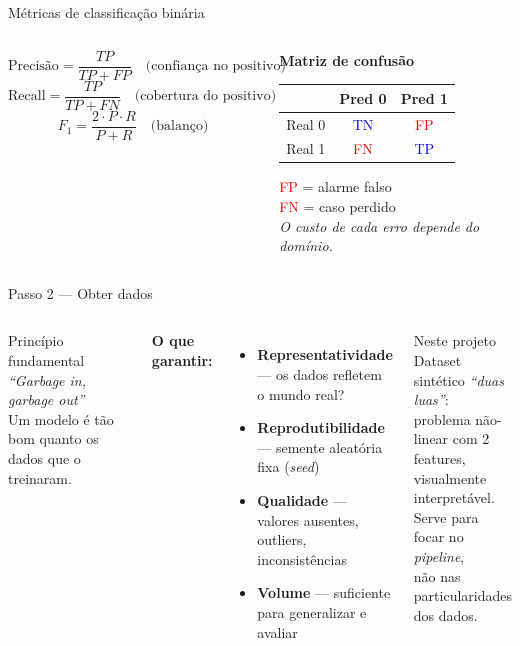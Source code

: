 \documentclass[aspectratio=169]{beamer}
\begin{document}
\begin{frame}{Métricas de classificação binária}
\begin{columns}
\[
  \text{Precisão} = \frac{TP}{TP + FP}
  \quad \text{(confiança no positivo)}
\]
\[
  \text{Recall} = \frac{TP}{TP + FN}
  \quad \text{(cobertura do positivo)}
\]
\[
  F_1 = \frac{2 \cdot P \cdot R}{P + R}
  \quad \text{(balanço)}
\]
\begin{center}
\textbf{Matriz de confusão}\\[6pt]
\begin{tabular}{r|cc}
         & Pred 0 & Pred 1 \\
\hline
Real 0   & \textcolor{blue}{TN} & \textcolor{red}{FP} \\
Real 1   & \textcolor{red}{FN} & \textcolor{blue}{TP} \\
\end{tabular}
\vspace{8pt}

\footnotesize
\textcolor{red}{FP} = alarme falso \\
\textcolor{red}{FN} = caso perdido \\[4pt]
\textit{O custo de cada erro depende do domínio.}
\end{center}
\end{columns}
\end{frame}

\begin{frame}{Passo 2 — Obter dados}
\begin{columns}
\begin{block}{Princípio fundamental}
  \textit{``Garbage in, garbage out''} \\
  Um modelo é tão bom quanto os dados que o treinaram.
\end{block}
\vspace{8pt}
\textbf{O que garantir:}
\begin{itemize}
  \item \textbf{Representatividade} — os dados refletem o mundo real?
  \item \textbf{Reprodutibilidade} — semente aleatória fixa (\textit{seed})
  \item \textbf{Qualidade} — valores ausentes, outliers, inconsistências
  \item \textbf{Volume} — suficiente para generalizar e avaliar
\end{itemize}
\begin{exampleblock}{Neste projeto}
  Dataset sintético \textit{``duas luas''}: \\
  problema não-linear com 2 features, \\
  visualmente interpretável.\\[4pt]
  Serve para focar no \emph{pipeline}, \\
  não nas particularidades dos dados.
\end{exampleblock}
\end{columns}
\end{frame}
\end{document}
